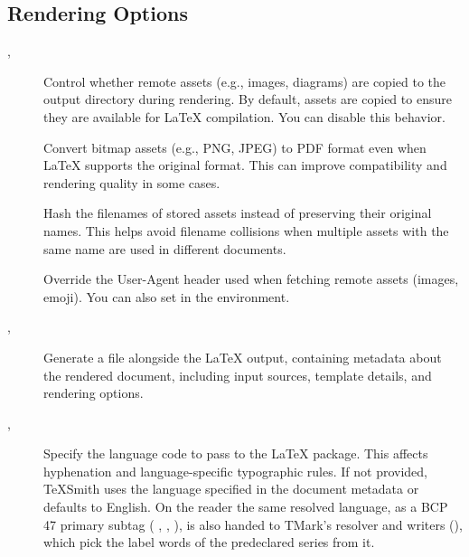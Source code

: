 \documentclass[a4paper,twoside]{article}
\begin{document}
\subsection{Rendering Options}
\begin{description}
\item[{, }] Control whether remote assets (e.g., images, diagrams) are copied to the output directory during rendering. By default, assets are copied to ensure they are available for \LaTeX{} compilation. You can disable this behavior.
\item[{}] Convert bitmap assets (e.g., PNG, JPEG) to PDF format even when \LaTeX{} supports the original format. This can improve compatibility and rendering quality in some cases.
\item[{}] Hash the filenames of stored assets instead of preserving their original names. This helps avoid filename collisions when multiple assets with the same name are used in different documents.
\item[{}] Override the User-Agent header used when fetching remote assets (images, emoji). You can also set  in the environment.
\item[{, }] Generate a  file alongside the \LaTeX{} output, containing metadata about the rendered document, including input sources, template details, and rendering options.
\item[{, }] Specify the language code to pass to the \LaTeX{}  package. This affects hyphenation and language-specific typographic rules. If not provided, TeXSmith uses the language specified in the document metadata or defaults to English. On the  reader the same resolved language, as a BCP 47 primary subtag ( ,  ,  ), is also handed to TMark's resolver and writers (), which pick the label words of the predeclared series from it.

\end{description}
\end{document}
